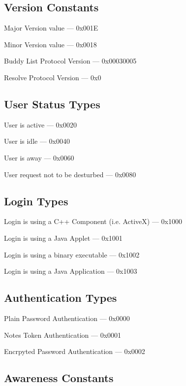 \documentclass[titlepage,oneside]{book}
\begin{document}
\subsection{Version Constants}

Major Version value                               --- 0x001E

Minor Version value                               --- 0x0018

Buddy List Protocol Version                          --- 0x00030005

Resolve Protocol Version                          --- 0x0

\subsection{User Status Types}

User is active                                    --- 0x0020

User is idle                                      --- 0x0040

User is away                                      --- 0x0060

User request not to be desturbed                  --- 0x0080

\subsection{Login Types}

Login is using a C++ Component (i.e. ActiveX)     --- 0x1000

Login is using a Java Applet                      --- 0x1001

Login is using a binary executable                --- 0x1002

Login is using a Java Application                 --- 0x1003

\subsection{Authentication Types}

Plain Password Authentication                     --- 0x0000

Notes Token Authentication                        --- 0x0001

Encrpyted Password Authentication                 --- 0x0002

\subsection{Awareness Constants}
\end{document}
